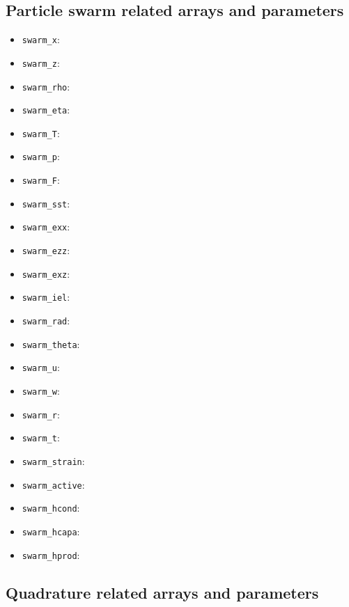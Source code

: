 \documentclass[a4paper,12pt]{article}
\begin{document}
\subsection{Particle swarm related arrays and parameters}

\begin{itemize}
\item \lstinline{swarm_x}: 
\item \lstinline{swarm_z}:
\item \lstinline{swarm_rho}:
\item \lstinline{swarm_eta}:
\item \lstinline{swarm_T}:
\item \lstinline{swarm_p}:
\item \lstinline{swarm_F}:
\item \lstinline{swarm_sst}:
\item \lstinline{swarm_exx}:
\item \lstinline{swarm_ezz}:
\item \lstinline{swarm_exz}:
\item \lstinline{swarm_iel}:
\item \lstinline{swarm_rad}:
\item \lstinline{swarm_theta}:
\item \lstinline{swarm_u}:
\item \lstinline{swarm_w}:
\item \lstinline{swarm_r}:
\item \lstinline{swarm_t}:
\item \lstinline{swarm_strain}:
\item \lstinline{swarm_active}:
\item \lstinline{swarm_hcond}:
\item \lstinline{swarm_hcapa}:
\item \lstinline{swarm_hprod}:
\end{itemize}

\subsection{Quadrature related arrays and parameters}
\end{document}
